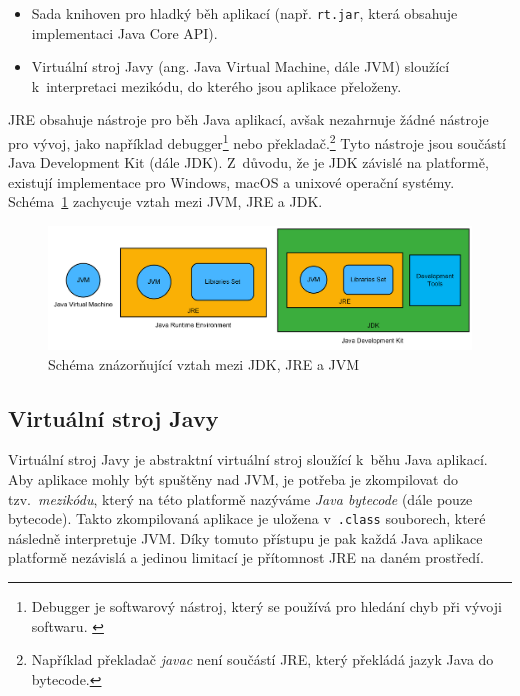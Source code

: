 \documentclass[
  master,
  biblatex,
  figures=true,
  theorems,
  sourcecodes,
  glossaries,
  index
]{kidiplom}
\begin{document}
\begin{itemize}
    \item Sada knihoven pro hladký běh aplikací (např. \texttt{rt.jar}, která obsahuje implementaci Java Core API).
    \item Virtuální stroj Javy (ang. Java Virtual Machine, dále JVM) sloužící k~interpretaci mezikódu, do kterého jsou aplikace přeloženy.  
\end{itemize}

JRE obsahuje nástroje pro běh Java aplikací, avšak nezahrnuje žádné nástroje pro vývoj, jako například debugger\footnote{Debugger je softwarový nástroj, který se používá pro hledání chyb při vývoji softwaru. \cite{debugger}} nebo překladač.\footnote{Například překladač \textit{javac} není součástí JRE, který překládá jazyk Java do bytecode.} Tyto nástroje jsou součástí Java Development Kit (dále JDK). Z~důvodu, že je JDK závislé na platformě, existují implementace pro Windows, macOS a unixové operační systémy. Schéma~\ref{fig:jdk jre jvm scheme} zachycuje vztah mezi JVM, JRE a JDK.


\begin{figure} [h]
    \centering
    \includegraphics[width= 1\textwidth]{images/jvm-jre-jdk.png}
    \caption{Schéma znázorňující vztah mezi JDK, JRE a JVM}
    \label{fig:jdk jre jvm scheme}
\end{figure}


\subsection{Virtuální stroj Javy}
Virtuální stroj Javy je abstraktní virtuální stroj sloužící k~běhu Java aplikací. Aby aplikace mohly být spuštěny nad JVM, je potřeba je zkompilovat do tzv.~\textit{mezikódu}, který na této platformě nazýváme \textit{Java bytecode} (dále pouze bytecode). Takto zkompilovaná aplikace je uložena v~\texttt{.class} souborech, které následně interpretuje JVM. Díky tomuto přístupu je pak každá Java aplikace platformě nezávislá a jedinou limitací je přítomnost JRE na daném prostředí.  
\end{document}
